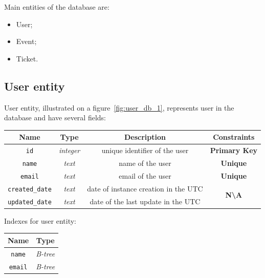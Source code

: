 Main entities of the database are:
\begin{itemize}
    \item User;
    \item Event;
    \item Ticket.
\end{itemize}

\subsection{User entity}\label{subsec:user-entity}
User entity, illustrated on a figure~\ref{fig:user_db_1}, represents user in the database and have several fields:

\begin{center}
    \begin{tabular}{ | c | c | c | c | }
        \hline
        \textbf{Name}          & \textbf{Type}    & \textbf{Description}                 & \textbf{Constraints}                         \\ \hline
        \texttt{id}            & \textit{integer} & unique identifier of the user        & \textbf{\color{red}Primary Key}              \\ \hline
        \texttt{name}          & \textit{text}    & name of the user                     & \textbf{\color{blue}Unique}                  \\ \hline
        \texttt{email}         & \textit{text}    & email of the user                    & \textbf{\color{blue}Unique}                  \\ \hline
        \texttt{created\_date} & \textit{text}    & date of instance creation in the UTC & \multirow{2}{*}{\textbf{N\textbackslash{A}}} \\ \cline{0-2}
        \texttt{updated\_date} & \textit{text}    & date of the last update in the UTC   &                                              \\ \hline
    \end{tabular}
\end{center}

Indexes for user entity:

\begin{center}
    \begin{tabular}{ | c | c | }
        \hline
        \textbf{Name}  & \textbf{Type}   \\ \hline
        \texttt{name}  & \textit{B-tree} \\ \hline
        \texttt{email} & \textit{B-tree} \\ \hline
    \end{tabular}
\end{center}


